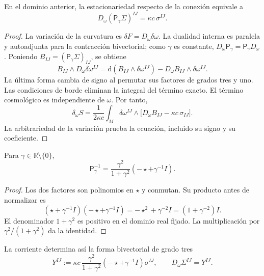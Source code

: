 \begin{HMTCompactSection}
\begin{theorem}
\label{x_reciprocidad:vii:thm:ecuacion-cartan-holst}
En el dominio anterior, la estacionariedad respecto de la conexión
equivale a
\begin{equation}
 D_\omega(\mathsf P_\gamma\Sigma)^{IJ}
       =\kappa c\,\sigma^{IJ}.
 \label{x_reciprocidad:vii:eq:ecuacion-cartan-holst}
\end{equation}
\end{theorem}
\begin{proof}
La variación de la curvatura es
\(\delta F=D_\omega\delta\omega\). La dualidad interna es paralela
y autoadjunta para la contracción bivectorial; como \(\gamma\) es
constante, \(D_\omega\mathsf P_\gamma=\mathsf P_\gamma D_\omega\).
Poniendo \(B_{IJ}=(\mathsf P_\gamma\Sigma)_{IJ}\), se obtiene
\[
 B_{IJ}\wedge D_\omega\delta\omega^{IJ}
 =\mathrm d(B_{IJ}\wedge\delta\omega^{IJ})
   -D_\omega B_{IJ}\wedge\delta\omega^{IJ}.
\]
La última forma cambia de signo al permutar sus factores de grados tres
y uno. Las condiciones de borde eliminan la integral del término
exacto. El término cosmológico es independiente de \(\omega\).
Por tanto,
\[
 \delta_\omega S=
 \frac1{2\kappa c}\int_M\delta\omega^{IJ}\wedge
       \bigl[D_\omega B_{IJ}-\kappa c\,\sigma_{IJ}\bigr].
\]
La arbitrariedad de la variación prueba la ecuación, incluido su signo
y su coeficiente.
\end{proof}

\begin{lemma}
\label{x_reciprocidad:vii:lem:inversa-holst}
Para \(\gamma\in\mathbb R\setminus\{0\}\),
\begin{equation}
 \mathsf P_\gamma^{-1}
 =\frac{\gamma^2}{1+\gamma^2}
                      (-\star+\gamma^{-1}I).
 \label{x_reciprocidad:vii:eq:inversa-holst}
\end{equation}
\end{lemma}
\begin{proof}
Los dos factores son polinomios en \(\star\) y conmutan. Su producto
antes de normalizar es
\[
 (\star+\gamma^{-1}I)(-\star+\gamma^{-1}I)
 =-\star^2+\gamma^{-2}I=(1+\gamma^{-2})I.
\]
El denominador \(1+\gamma^2\) es positivo en el dominio real fijado.
La multiplicación por \(\gamma^2/(1+\gamma^2)\) da la identidad.
\end{proof}

La corriente determina así la forma bivectorial de grado tres
\begin{equation}
 Y^{IJ}:=\kappa c\,
   \frac{\gamma^2}{1+\gamma^2}
   (-\star+\gamma^{-1}I)\sigma^{IJ},
 \qquad D_\omega\Sigma^{IJ}=Y^{IJ}.
 \label{x_reciprocidad:vii:eq:corriente-dualizada}
\end{equation}


\end{HMTCompactSection}
